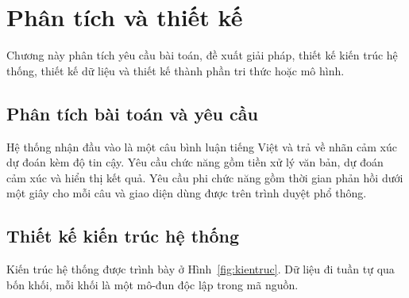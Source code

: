 \chapter{Phân tích và thiết kế}
\label{ch:thietke}

\begin{muctieu}
Chương này phân tích yêu cầu bài toán, đề xuất giải pháp, thiết kế kiến trúc
hệ thống, thiết kế dữ liệu và thiết kế thành phần tri thức hoặc mô hình.
\end{muctieu}

\section{Phân tích bài toán và yêu cầu}

\begin{chuy}
\end{chuy}

\begin{mau}
Hệ thống nhận đầu vào là một câu bình luận tiếng Việt và trả về nhãn cảm xúc
dự đoán kèm độ tin cậy. Yêu cầu chức năng gồm tiền xử lý văn bản, dự đoán
cảm xúc và hiển thị kết quả. Yêu cầu phi chức năng gồm thời gian phản hồi
dưới một giây cho mỗi câu và giao diện dùng được trên trình duyệt phổ thông.
\end{mau}

\section{Thiết kế kiến trúc hệ thống}

\begin{chuy}
\end{chuy}

Kiến trúc hệ thống được trình bày ở Hình~\ref{fig:kientruc}. Dữ liệu đi tuần
tự qua bốn khối, mỗi khối là một mô-đun độc lập trong mã nguồn.

